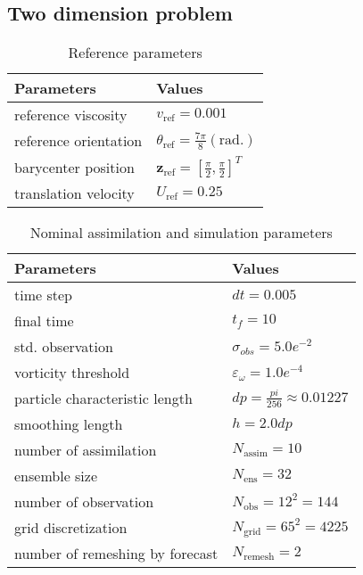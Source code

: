 \subsection{Two dimension problem}
\begin{table}[htbp]
    \centering
    \caption{Reference parameters}
    \begin{tabular}[t]{|l|l|}
        \hline
        Parameters            & Values                                                       \\
        \hline
        reference viscosity   & $v_{\text{ref}} = 0.001$                                     \\
        reference orientation & $\theta_{\text{ref}}  = \frac{7 \pi}{8} (\text{rad.})$       \\
        barycenter position   & $\bm{z}_{\text{ref}} = \left[\frac\pi2, \frac\pi2 \right]^T$ \\
        translation velocity  & $U_{\text{ref}} = 0.25$                                      \\
        \hline
    \end{tabular}
    \label{tab:ref}
\end{table}

\begin{table}[htbp]
    \centering
    \caption{Nominal assimilation and simulation parameters}
    \begin{tabular}[t]{|l|l|}
        \hline
        Parameters                      & Values                                 \\
        \hline
        time step                       & $dt = 0.005$                           \\
        final time                      & $t_f =10$                              \\
        std. observation                & $\sigma_{obs} =  5.0e^{-2}$            \\
        vorticity threshold             & $\varepsilon_{\omega} = 1.0e^{-4}$     \\
        particle characteristic length  & $dp = \frac{pi}{256} \approx 0.01227 $ \\
        smoothing length                & $h = 2.0 dp$                           \\
        number of assimilation          & $N_{\text{assim}} = 10$                \\
        ensemble size                   & $N_{\text{ens}} = 32$                  \\
        number of observation           & $N_{\text{obs}} = 12^2 = 144$          \\
        grid discretization             & $N_{\text{grid}} = 65^2 = 4225$        \\
        number of remeshing by forecast & $N_{\text{remesh}} =  2 $              \\
        \hline
    \end{tabular}
    \label{tab:simu_2d}
\end{table}

